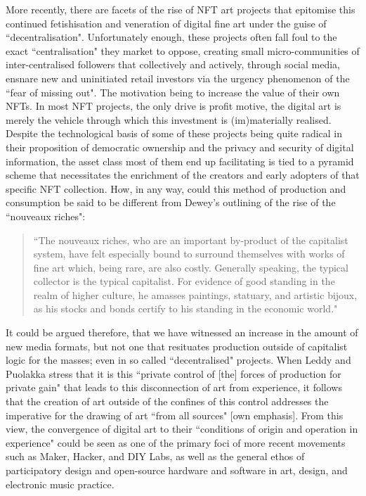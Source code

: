 More recently, there are facets of the rise of NFT art projects that epitomise this continued fetishisation and veneration of digital fine art under the guise of ``decentralisation". Unfortunately enough, these projects often fall foul to the exact ``centralisation" they market to oppose, creating small micro-communities of inter-centralised followers that collectively and actively, through social media, ensnare new and uninitiated retail investors via the urgency phenomenon of the ``fear of missing out". The motivation being to increase the value of their own NFTs. In most NFT projects, the only drive is profit motive, the digital art is merely the vehicle through which this investment is (im)materially realised. Despite the technological basis of some of these projects being quite radical in their proposition of democratic ownership and the privacy and security of digital information, the asset class most of them end up facilitating is tied to a pyramid scheme that necessitates the enrichment of the creators and early adopters of that specific NFT collection. How, in any way, could this method of production and consumption be said to be different from Dewey's outlining of the rise of the ``nouveaux riches":
\begin{quote}
    ``The nouveaux riches, who are an important by-product of the capitalist system, have felt especially bound to surround themselves with works of fine art which, being rare, are also costly. Generally speaking, the typical collector is the typical capitalist. For evidence of good standing in the realm of higher culture, he amasses paintings, statuary, and artistic bijoux, as his stocks and bonds certify to his standing in the economic world." \citeyearpar[p. 7]{dewey1934}
\end{quote}
It could be argued therefore, that we have witnessed an increase in the amount of new media formats, but not one that resituates production outside of capitalist logic for the masses; even in so called ``decentralised" projects. When Leddy and Puolakka stress that it is this ``private control of [the] forces of production for private gain" that leads to this disconnection of art from experience, it follows that the creation of art outside of the confines of this control addresses the imperative for the drawing of art ``from all sources" [own emphasis]. From this view, the convergence of digital art to their ``conditions of origin and operation in experience" could be seen as one of the primary foci of more recent movements such as Maker, Hacker, and DIY Labs, as well as the general ethos of participatory design and open-source hardware and software in art, design, and electronic music practice.


